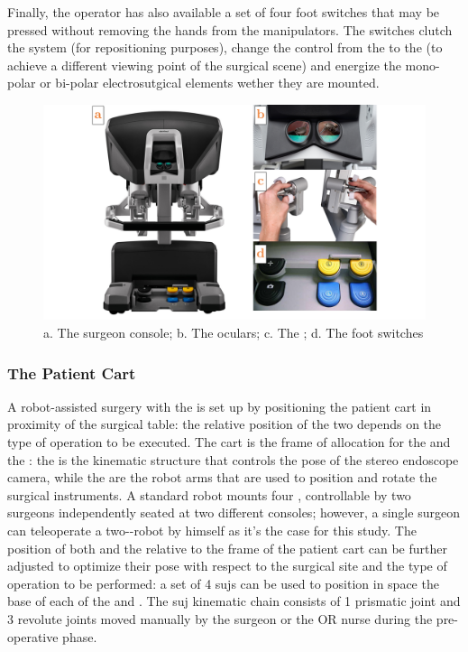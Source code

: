 \documentclass[../main.tex]{subfiles}
\begin{document}
Finally, the operator has also available a set of four foot switches that may be pressed without removing the hands from the manipulators. The switches clutch the system (for repositioning purposes), change the control from the \psms to the \ecm (to achieve a different viewing point of the surgical scene) and energize the mono-polar or bi-polar electrosutgical elements wether they are mounted.

\begin{figure}[h]
    \centering
    \includegraphics[width=\textwidth]{images/surgeon_cart_panel.png}
    \caption{a. The \davinci surgeon console; b. The \hrsv oculars; c. The \mtms; d. The foot switches}
    \label{fig:surgeonconsolepanel}
\end{figure}

\subsubsection{The Patient Cart}
A robot-assisted surgery with the \davinci is set up by positioning the patient cart in proximity of the surgical table: the relative position of the two depends on the type of operation to be executed. 
The cart is the frame of allocation for the \psms and the \ecm: the \ecm is the kinematic structure that controls the pose of the stereo endoscope camera, while the \psms are the robot arms that are used to position and rotate the surgical instruments. A standard \davinci robot mounts four \psms, controllable by two surgeons independently seated at two different consoles; however, a single surgeon can teleoperate a two-\psms-robot by himself as it's the case for this study.
The position of both \psms and the \ecm relative to the frame of the patient cart can be further adjusted to optimize their pose with respect to the surgical site and the type of operation to be performed: a set of 4 \acp{suj} can be used to position in space the base of each of the \psms and \ecm. The \ac{suj} kinematic chain consists of 1 prismatic joint and 3 revolute joints moved manually by the surgeon or the OR nurse during the pre-operative phase.
\end{document}
